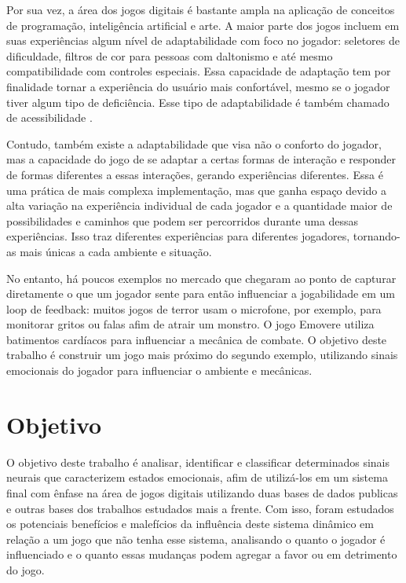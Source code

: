 Por sua vez, a área dos jogos digitais é bastante ampla na aplicação de conceitos de programação, inteligência artificial e arte. A maior parte dos jogos incluem em suas experiências algum nível de adaptabilidade com foco no jogador: seletores de dificuldade, filtros de cor para pessoas com daltonismo e até mesmo compatibilidade com controles especiais. Essa capacidade de adaptação tem por finalidade tornar a experiência do usuário mais confortável, mesmo se o jogador tiver algum tipo de deficiência. Esse tipo de adaptabilidade é também chamado de acessibilidade \cite{acessibilidadenosjogos}. 

Contudo, também existe a adaptabilidade que visa não o conforto do jogador, mas a capacidade do jogo de se adaptar a certas formas de interação e responder de formas diferentes a essas interações, gerando experiências diferentes. Essa é uma prática de mais complexa implementação, mas que ganha espaço devido a alta variação na experiência individual de cada jogador e a quantidade maior de possibilidades e caminhos que podem ser percorridos durante uma dessas experiências. Isso traz diferentes experiências para diferentes jogadores, tornando-as mais únicas a cada ambiente e situação.

No entanto, há poucos exemplos no mercado que chegaram ao ponto de capturar diretamente o que um jogador sente para então influenciar a jogabilidade em um loop de feedback: muitos jogos de terror usam o microfone, por exemplo, para monitorar gritos ou falas afim de atrair um monstro. O jogo Emovere \cite{filipa2019emovere} utiliza batimentos cardíacos para influenciar a mecânica de combate. O objetivo deste trabalho é construir um jogo mais próximo do segundo exemplo, utilizando sinais emocionais do jogador para influenciar o ambiente e mecânicas.

\section{Objetivo}

O objetivo deste trabalho é analisar, identificar e classificar determinados sinais neurais que caracterizem estados emocionais, afim de utilizá-los em um sistema final com ênfase na área de jogos digitais utilizando duas bases de dados publicas e outras bases dos trabalhos estudados mais a frente. Com isso, foram estudados os potenciais benefícios e malefícios da influência deste sistema dinâmico em relação a um jogo que não tenha esse sistema, analisando o quanto o jogador é influenciado e o quanto essas mudanças podem agregar a favor ou em detrimento do jogo.

